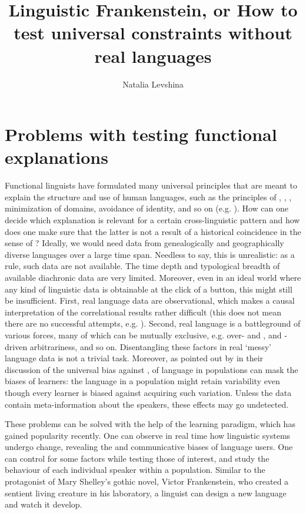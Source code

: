 \documentclass[output=paper]{langsci/langscibook}
\author{Natalia Levshina\affiliation{Leipzig University}}
\title{Linguistic {Frankenstein}, or {How} to test universal constraints without real languages}
\begin{document}
\maketitle 
 

\section{Problems with testing functional explanations} 

Functional linguists have formulated many universal principles that are meant to explain the structure and use of human languages, such as the principles of , ,  , minimization of domains, avoidance of identity, and so on (e.g. \citealt{Haiman1983,Rohdenburg1996,Rohdenburg2003,Hawkins2004,Haspelmath2008_FreqIcon}). How can one decide which explanation is relevant for a certain cross-linguistic pattern and how does one make sure that the latter is not a result of a historical coincidence in the sense of ? Ideally, we would need data from genealogically and geographically diverse languages over a large time span. Needless to say, this is unrealistic: as a rule, such data are not available. The time depth and typological breadth of available diachronic data are very limited. Moreover, even in an ideal world where any kind of linguistic data is obtainable at the click of a button, this might still be insufficient. First, real language data are observational, which makes a causal interpretation of the correlational results rather difficult (this does not mean there are no successful attempts, e.g. \citealt{Prado2014}). Second, real language is a battleground of various forces, many of which can be mutually exclusive, e.g. over- and ,  and -driven arbitrariness, and so on. Disentangling these factors in real ‘messy’ language data is not a trivial task. Moreover, as pointed out by \citet{SmithEtAl2017} in their discussion of the universal bias against ,  of language in populations can mask the biases of learners: the language in a population might retain variability even though every learner is biased against acquiring such variation. Unless the data contain meta-information about the speakers, these effects may go undetected.

These problems can be solved with the help of the  learning paradigm, which has gained popularity recently. One can observe in real time how linguistic systems undergo change, revealing the  and communicative biases of language users. One can control for some factors while testing those of interest, and study the behaviour of each individual speaker within a population. Similar to the protagonist of Mary Shelley’s gothic novel, Victor Frankenstein, who created a sentient living creature in his laboratory, a linguist can design a new language and watch it develop. 
\end{document}
